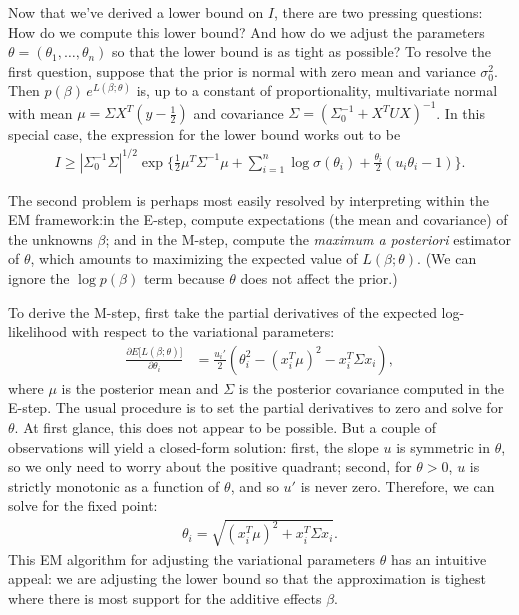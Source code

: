 \documentclass[final]{siamltex}
\newcommand{\smfrac}[2]{{\textstyle\frac{#1}{#2}}}
\newcommand{\half}{{\textstyle\frac{1}{2}}}
\newcommand{\lb}{\bm{[}}
\newcommand{\rb}{\bm{]}}
\begin{document}
Now that we've derived a lower bound on $I$, there are two pressing
questions: How do we compute this lower bound? And how do we adjust
the parameters $\theta = (\theta_1, \ldots, \theta_n)$ so that the
lower bound is as tight as possible? To resolve the first question,
suppose that the prior is normal with zero mean and variance
$\sigma_0^2$. Then $p(\beta) \, e^{L(\beta; \theta)}$ is, up to a
constant of proportionality, multivariate normal with mean $\mu =
\Sigma X^T(y - \half)$ and covariance $\Sigma = (\Sigma_0^{-1} +
X^TUX)^{-1}$. In this special case, the expression for the lower bound
works out to be
\begin{align*}
I \geq |\Sigma_0^{-1}\Sigma|^{1/2} 
\exp\Big\{ \half \mu^T\Sigma^{-1}\mu + 
{\textstyle \sum_{i=1}^n \log\sigma(\theta_i) + 
\smfrac{\theta_i}{2}(u_i\theta_i - 1)}\Big\}.
\end{align*}

The second problem is perhaps most easily resolved by interpreting
within the EM framework:in the E-step, compute expectations (the mean
and covariance) of the unknowns $\beta$; and in the M-step, compute
the {\em maximum a posteriori} estimator of $\theta$, which amounts to
maximizing the expected value of $L(\beta; \theta)$. (We can ignore
the $\log p(\beta)$ term because $\theta$ does not affect the prior.)

To derive the M-step, first take the partial derivatives of the
expected log-likelihood with respect to the variational parameters:
\begin{align*}
\frac{\partial E\lb L(\beta;\theta)\rb}{\partial \theta_i} &=
\frac{u_i'}{2}(\theta_i^2 - (x_i^T\mu)^2 - x_i^T \Sigma x_i),
\end{align*}
where $\mu$ is the posterior mean and $\Sigma$ is the posterior
covariance computed in the E-step. The usual procedure is to set the
partial derivatives to zero and solve for $\theta$. At first glance,
this does not appear to be possible. But a couple of observations will
yield a closed-form solution: first, the slope $u$ is symmetric in
$\theta$, so we only need to worry about the positive quadrant;
second, for $\theta > 0$, $u$ is strictly monotonic as a function of
$\theta$, and so $u'$ is never zero. Therefore, we can solve for the
fixed point:
\begin{align*}
\theta_i = \sqrt{(x_i^T\mu)^2 + x_i^T \Sigma x_i}.
\end{align*}
This EM algorithm for adjusting the variational parameters $\theta$
has an intuitive appeal: we are adjusting the lower bound so that the
approximation is tighest where there is most support for the additive
effects $\beta$.
  
\end{document}
